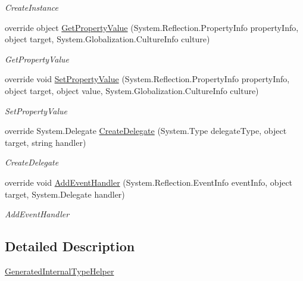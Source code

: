 \begin{DoxyCompactItemize}
\begin{DoxyCompactList}\small\item\em Create\+Instance \end{DoxyCompactList}\item 
override object \hyperlink{classXamlGeneratedNamespace_1_1GeneratedInternalTypeHelper_afdc9fe15b56607d02082908d934480c6}{Get\+Property\+Value} (System.\+Reflection.\+Property\+Info property\+Info, object target, System.\+Globalization.\+Culture\+Info culture)
\begin{DoxyCompactList}\small\item\em Get\+Property\+Value \end{DoxyCompactList}\item 
override void \hyperlink{classXamlGeneratedNamespace_1_1GeneratedInternalTypeHelper_ade0f04c0f7b18dd5b170e071d5534d38}{Set\+Property\+Value} (System.\+Reflection.\+Property\+Info property\+Info, object target, object value, System.\+Globalization.\+Culture\+Info culture)
\begin{DoxyCompactList}\small\item\em Set\+Property\+Value \end{DoxyCompactList}\item 
override System.\+Delegate \hyperlink{classXamlGeneratedNamespace_1_1GeneratedInternalTypeHelper_a8ec4c37e82d9f4e867e9655f4eac3a78}{Create\+Delegate} (System.\+Type delegate\+Type, object target, string handler)
\begin{DoxyCompactList}\small\item\em Create\+Delegate \end{DoxyCompactList}\item 
override void \hyperlink{classXamlGeneratedNamespace_1_1GeneratedInternalTypeHelper_a73471f4a6d1ca4c4fceec9ad8610f0c8}{Add\+Event\+Handler} (System.\+Reflection.\+Event\+Info event\+Info, object target, System.\+Delegate handler)
\begin{DoxyCompactList}\small\item\em Add\+Event\+Handler \end{DoxyCompactList}\end{DoxyCompactItemize}


\subsection{Detailed Description}
\hyperlink{classXamlGeneratedNamespace_1_1GeneratedInternalTypeHelper}{Generated\+Internal\+Type\+Helper} 



